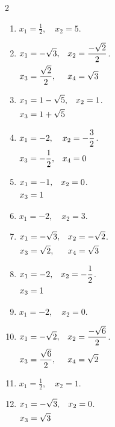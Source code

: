 \documentclass[11pt,a4paper]{article}
\begin{document}
\begin{multicols}{2}
\begin{enumerate}
\item \(\displaystyle x_{1}=\frac{1}{2},\quad x_{2}=5\).
\item \(\displaystyle \begin{alignedat}[t]{2}x_{1}&=-\sqrt{3},\quad &x_{2}&=\frac{-\sqrt{2}}{2}\\x_{3}&=\frac{\sqrt{2}}{2},\quad &x_{4}&=\sqrt{3}\end{alignedat}\).
\item \(\displaystyle \begin{alignedat}[t]{2}x_{1}&=1-\sqrt{5},\quad &x_{2}&=1\\x_{3}&=1+\sqrt{5}\end{alignedat}\).
\item \(\displaystyle \begin{alignedat}[t]{2}x_{1}&=-2,\quad &x_{2}&=-\frac{3}{2}\\x_{3}&=-\frac{1}{2},\quad &x_{4}&=0\end{alignedat}\).
\item \(\displaystyle \begin{alignedat}[t]{2}x_{1}&=-1,\quad &x_{2}&=0\\x_{3}&=1\end{alignedat}\).
\item \(\displaystyle x_{1}=-2,\quad x_{2}=3\).
\item \(\displaystyle \begin{alignedat}[t]{2}x_{1}&=-\sqrt{3},\quad &x_{2}&=-\sqrt{2}\\x_{3}&=\sqrt{2},\quad &x_{4}&=\sqrt{3}\end{alignedat}\).
\item \(\displaystyle \begin{alignedat}[t]{2}x_{1}&=-2,\quad &x_{2}&=-\frac{1}{2}\\x_{3}&=1\end{alignedat}\).
\item \(\displaystyle x_{1}=-2,\quad x_{2}=0\).
\item \(\displaystyle \begin{alignedat}[t]{2}x_{1}&=-\sqrt{2},\quad &x_{2}&=\frac{-\sqrt{6}}{2}\\x_{3}&=\frac{\sqrt{6}}{2},\quad &x_{4}&=\sqrt{2}\end{alignedat}\).
\item \(\displaystyle x_{1}=\frac{1}{2},\quad x_{2}=1\).
\item \(\displaystyle \begin{alignedat}[t]{2}x_{1}&=-\sqrt{3},\quad &x_{2}&=0\\x_{3}&=\sqrt{3}\end{alignedat}\).

\end{enumerate}
\end{multicols}
\end{document}
